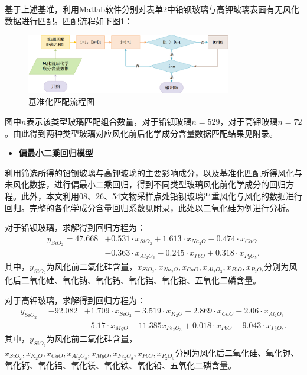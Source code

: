 \documentclass[withoutpreface,bwprint]{cumcmthesis} %
\begin{document}
基于上述基准，利用Matlab软件分别对表单2中铅钡玻璃与高钾玻璃表面有无风化数据进行匹配。匹配流程如下图\ref{pipei}：
\begin{figure}[H]
  \centering
  \includegraphics[width=0.8\textwidth]{figure/匹配}
  \caption{基准化匹配流程图}
  \label{pipei}
\end{figure}
图中$n$表示该类型玻璃匹配组合数量，对于铅钡玻璃$n=529$，对于高钾玻璃$n=72$。由此得到两种类型玻璃对应风化前后化学成分含量数据匹配结果见附录。

\begin{itemize}
  \item \textbf{偏最小二乘回归模型}
\end{itemize}

利用筛选所得的铅钡玻璃与高钾玻璃的主要影响成分，以及基准化匹配所得风化与未风化数据，进行偏最小二乘回归，得到不同类型玻璃风化前化学成分的回归方程。此外，本文利用08、26、54文物采样点处铅钡玻璃严重风化与风化的数据进行回归。完整的各化学成分含量回归系数见附录，此处以二氧化硅为例进行分析。

对于铅钡玻璃，求解得到回归方程为：
\begin{equation}
  \begin{aligned}
 y_{SiO_2} = 47.668 & +  0.531 \cdot x_{SiO_2} + 1.613 \cdot x_{Na_2O} - 0.474\cdot x_{CaO} \\ & -0.363\cdot x_{Al_2O_3}  -0.245\cdot x_{PbO} +0.318\cdot x_{P_2O_5} .
\end{aligned}
\end{equation}
其中，$y_{SiO_2}$为风化前二氧化硅含量，$x_{SiO_2},x_{Na_2O},x_{CaO},x_{Al_2O_3},x_{PbO}, x_{P_2O_5}$分别为风化后二氧化硅、氧化钠、氧化钙、氧化铝、氧化铅、五氧化二磷含量。

对于高钾玻璃，求解得到回归方程为：
\begin{equation}
  \begin{aligned}
    y_{SiO_2} = -92.082 & +  1.709 \cdot x_{SiO_2} - 3.519 \cdot x_{K_2O} +2.869 \cdot x_{CaO}  +2.06 \cdot x_{Al_2O_3} \\ & -5.17\cdot x_{MgO} -11.385 x_{Fe_2O_3} + 0.018 \cdot x_{PbO} -9.043 \cdot x_{P_2O_5} .
  \end{aligned}
\end{equation}
其中，$y_{SiO_2}$为风化前二氧化硅含量，$x_{SiO_2},x_{K_2O},x_{CaO},x_{Al_2O_3},x_{MgO},x_{Fe_2O_3},x_{PbO}, x_{P_2O_5}$分别为风化后二氧化硅、氧化钾、氧化钙、氧化铝、氧化镁、氧化铁、氧化铅、五氧化二磷含量。
\end{document}

